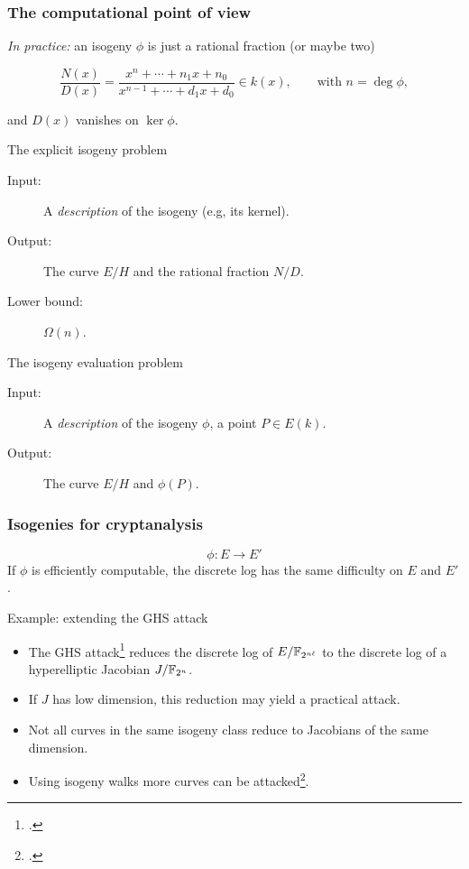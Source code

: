 \documentclass{beamer}
\begin{document}

\begin{frame}
  \frametitle{The computational point of view}
  
  \emph{In practice:} an isogeny $\phi$ is just a rational fraction (or maybe two)
  
  \alert{\[\frac{N(x)}{D(x)} = \frac{x^n + \cdots + n_1x +
      n_0}{x^{n-1} + \cdots + d_1x + d_0} \in k(x),\qquad\text{with }
    n=\deg\phi,\]}
  
  and $D(x)$ vanishes on $\ker\phi$.

  \begin{block}{The explicit isogeny problem}
    \begin{description}
    \item[Input:] A \textit{description} of the isogeny (e.g, its kernel).
    \item[Output:] The curve \emph{$E/H$} and the rational fraction \emph{$N/D$}.
    \item[Lower bound:] $\Omega(n)$.
    \end{description}
  \end{block}

  \begin{block}{The isogeny evaluation problem}
    \begin{description}
    \item[Input:] A \textit{description} of the isogeny \emph{$\phi$},
      a point \emph{$P\in E(k)$}.
    \item[Output:] The curve \emph{$E/H$} and \emph{$\phi(P)$}.
    \end{description}
  \end{block}
\end{frame}


\begin{frame}
  \frametitle{Isogenies for cryptanalysis}
  \[\phi:E \to E'\]
  If $\phi$ is efficiently computable, the \alert{discrete log} has
  the same difficulty on $E$ and $E'$.

  \begin{block}{Example: extending the GHS attack}
    \begin{itemize}
    \item The GHS attack\footcite{gaudry+hess+smart02} reduces the
      discrete log of \emph{$E/\mathbb{F}_{2^{n\ell}}$} to the discrete log of
      a hyperelliptic Jacobian \emph{$J/\mathbb{F}_{2^n}$}.
    \item If \emph{$J$} has \alert{low dimension}, this reduction may
      yield a \alert{practical attack}.
    \item Not all curves in the same \alert{isogeny class} reduce to
      Jacobians of the same dimension.
    \item Using \alert{isogeny walks} more curves can be
      attacked\footcite{GHS}.
    \end{itemize}
  \end{block}
\end{frame}
\end{document}
